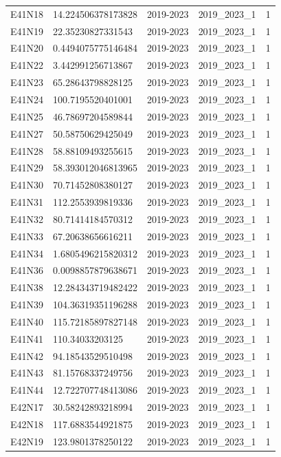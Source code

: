 \begin{landscape}
\begin{longtable}{lllll}
E41N18 & 14.224506378173828 & 2019-2023 & 2019\_2023\_1 & 1 \\
E41N19 & 22.35230827331543 & 2019-2023 & 2019\_2023\_1 & 1 \\
E41N20 & 0.4494075775146484 & 2019-2023 & 2019\_2023\_1 & 1 \\
E41N22 & 3.442991256713867 & 2019-2023 & 2019\_2023\_1 & 1 \\
E41N23 & 65.28643798828125 & 2019-2023 & 2019\_2023\_1 & 1 \\
E41N24 & 100.7195520401001 & 2019-2023 & 2019\_2023\_1 & 1 \\
E41N25 & 46.78697204589844 & 2019-2023 & 2019\_2023\_1 & 1 \\
E41N27 & 50.58750629425049 & 2019-2023 & 2019\_2023\_1 & 1 \\
E41N28 & 58.88109493255615 & 2019-2023 & 2019\_2023\_1 & 1 \\
E41N29 & 58.393012046813965 & 2019-2023 & 2019\_2023\_1 & 1 \\
E41N30 & 70.71452808380127 & 2019-2023 & 2019\_2023\_1 & 1 \\
E41N31 & 112.2553939819336 & 2019-2023 & 2019\_2023\_1 & 1 \\
E41N32 & 80.71414184570312 & 2019-2023 & 2019\_2023\_1 & 1 \\
E41N33 & 67.20638656616211 & 2019-2023 & 2019\_2023\_1 & 1 \\
E41N34 & 1.6805496215820312 & 2019-2023 & 2019\_2023\_1 & 1 \\
E41N36 & 0.0098857879638671 & 2019-2023 & 2019\_2023\_1 & 1 \\
E41N38 & 12.284343719482422 & 2019-2023 & 2019\_2023\_1 & 1 \\
E41N39 & 104.36319351196288 & 2019-2023 & 2019\_2023\_1 & 1 \\
E41N40 & 115.72185897827148 & 2019-2023 & 2019\_2023\_1 & 1 \\
E41N41 & 110.34033203125 & 2019-2023 & 2019\_2023\_1 & 1 \\
E41N42 & 94.18543529510498 & 2019-2023 & 2019\_2023\_1 & 1 \\
E41N43 & 81.15768337249756 & 2019-2023 & 2019\_2023\_1 & 1 \\
E41N44 & 12.722707748413086 & 2019-2023 & 2019\_2023\_1 & 1 \\
E42N17 & 30.58242893218994 & 2019-2023 & 2019\_2023\_1 & 1 \\
E42N18 & 117.6883544921875 & 2019-2023 & 2019\_2023\_1 & 1 \\
E42N19 & 123.9801378250122 & 2019-2023 & 2019\_2023\_1 & 1 \\

\end{longtable}
\end{landscape}
